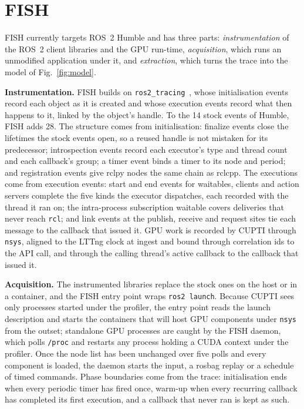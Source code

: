\section{FISH}
\label{sec:method}
FISH currently targets ROS~2 Humble and has three parts: \emph{instrumentation} of the ROS~2 client libraries and the GPU run-time, \emph{acquisition}, which runs an unmodified application under it, and \emph{extraction}, which turns the trace into the model of Fig.~\ref{fig:model}.

\noindent\textbf{Instrumentation.} FISH builds on \texttt{ros2\_tracing}~\cite{bedard-2022-ros2tracing}, whose initialisation events record each object as it is created and whose execution events record what then happens to it, linked by the object's handle. To the 14 stock events of Humble, FISH adds 28. The structure comes from initialisation: finalize events close the lifetimes the stock events open, so a reused handle is not mistaken for its predecessor; introspection events record each executor's type and thread count and each callback's group; a timer event binds a timer to its node and period; and registration events give rclpy nodes the same chain as rclcpp. The executions come from execution events: start and end events for waitables, clients and action servers complete the five kinds the executor dispatches, each recorded with the thread it ran on; the intra-process subscription waitable covers deliveries that never reach \texttt{rcl}; and link events at the publish, receive and request sites tie each message to the callback that issued it. GPU work is recorded by CUPTI through \texttt{nsys}, aligned to the LTTng clock at ingest and bound through correlation ids to the API call, and through the calling thread's active callback to the callback that issued it.

\noindent\textbf{Acquisition.} The instrumented libraries replace the stock ones on the host or in a container, and the FISH entry point wraps \texttt{ros2 launch}. Because CUPTI sees only processes started under the profiler, the entry point reads the launch description and starts the containers that will host GPU components under \texttt{nsys} from the outset; standalone GPU processes are caught by the FISH daemon, which polls \texttt{/proc} and restarts any process holding a CUDA context under the profiler. Once the node list has been unchanged over five polls and every component is loaded, the daemon starts the input, a rosbag replay or a schedule of timed commands. Phase boundaries come from the trace: initialisation ends when every periodic timer has fired once, warm-up when every recurring callback has completed its first execution, and a callback that never ran is kept as such.

